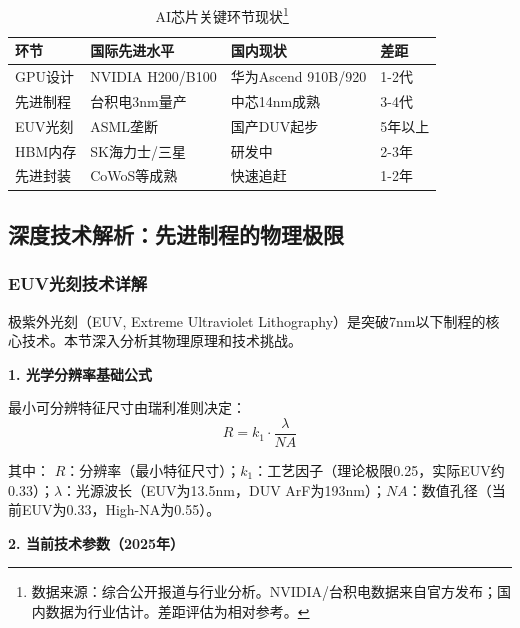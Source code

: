 \begin{table}[H]
\centering
\caption{AI芯片关键环节现状\protect\footnote{数据来源：综合公开报道与行业分析。NVIDIA/台积电数据来自官方发布；国内数据为行业估计。差距评估为相对参考。}}
\small
\begin{tabular}{p{2.5cm}p{3.5cm}p{3.5cm}p{2.5cm}}
\toprule
\textbf{环节} & \textbf{国际先进水平} & \textbf{国内现状} & \textbf{差距} \\
\midrule
GPU设计 & NVIDIA H200/B100 & 华为Ascend 910B/920 & 1-2代 \\
先进制程 & 台积电3nm量产 & 中芯14nm成熟 & 3-4代 \\
EUV光刻 & ASML垄断 & 国产DUV起步 & 5年以上 \\
HBM内存 & SK海力士/三星 & 研发中 & 2-3年 \\
先进封装 & CoWoS等成熟 & 快速追赶 & 1-2年 \\
\bottomrule
\end{tabular}
\end{table}


\subsection{深度技术解析：先进制程的物理极限}

\subsubsection{EUV光刻技术详解}

极紫外光刻（EUV, Extreme Ultraviolet Lithography）是突破7nm以下制程的核心技术。本节深入分析其物理原理和技术挑战\cite{ASML2024EUV, NaturePhotonics2023EUV, SolidStateElectronics2024}。

\textbf{1. 光学分辨率基础公式}

最小可分辨特征尺寸由瑞利准则决定：
\begin{equation}
R = k_1 \cdot \frac{\lambda}{NA}
\end{equation}

其中：
$R$：分辨率（最小特征尺寸）；$k_1$：工艺因子（理论极限0.25，实际EUV约0.33）；$\lambda$：光源波长（EUV为13.5nm，DUV ArF为193nm）；$NA$：数值孔径（当前EUV为0.33，High-NA为0.55）。

\textbf{2. 当前技术参数（2025年）}

